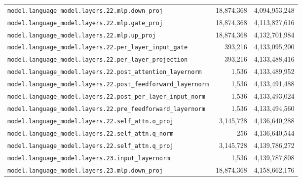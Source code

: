 \documentclass[10pt,a4paper]{article}
\theoremstyle{definition}
\begin{document}
\begin{appendices}
\begin{longtable}{p{9.5cm}rr}
\texttt{model.\allowbreak{}language\_model.\allowbreak{}layers.\allowbreak{}22.\allowbreak{}mlp.\allowbreak{}down\_proj} & 18,874,368 & 4,094,953,248 \\
\texttt{model.\allowbreak{}language\_model.\allowbreak{}layers.\allowbreak{}22.\allowbreak{}mlp.\allowbreak{}gate\_proj} & 18,874,368 & 4,113,827,616 \\
\texttt{model.\allowbreak{}language\_model.\allowbreak{}layers.\allowbreak{}22.\allowbreak{}mlp.\allowbreak{}up\_proj} & 18,874,368 & 4,132,701,984 \\
\texttt{model.\allowbreak{}language\_model.\allowbreak{}layers.\allowbreak{}22.\allowbreak{}per\_layer\_input\_gate} & 393,216 & 4,133,095,200 \\
\texttt{model.\allowbreak{}language\_model.\allowbreak{}layers.\allowbreak{}22.\allowbreak{}per\_layer\_projection} & 393,216 & 4,133,488,416 \\
\texttt{model.\allowbreak{}language\_model.\allowbreak{}layers.\allowbreak{}22.\allowbreak{}post\_attention\_layernorm} & 1,536 & 4,133,489,952 \\
\texttt{model.\allowbreak{}language\_model.\allowbreak{}layers.\allowbreak{}22.\allowbreak{}post\_feedforward\_layernorm} & 1,536 & 4,133,491,488 \\
\texttt{model.\allowbreak{}language\_model.\allowbreak{}layers.\allowbreak{}22.\allowbreak{}post\_per\_layer\_input\_norm} & 1,536 & 4,133,493,024 \\
\texttt{model.\allowbreak{}language\_model.\allowbreak{}layers.\allowbreak{}22.\allowbreak{}pre\_feedforward\_layernorm} & 1,536 & 4,133,494,560 \\
\texttt{model.\allowbreak{}language\_model.\allowbreak{}layers.\allowbreak{}22.\allowbreak{}self\_attn.\allowbreak{}o\_proj} & 3,145,728 & 4,136,640,288 \\
\texttt{model.\allowbreak{}language\_model.\allowbreak{}layers.\allowbreak{}22.\allowbreak{}self\_attn.\allowbreak{}q\_norm} & 256 & 4,136,640,544 \\
\texttt{model.\allowbreak{}language\_model.\allowbreak{}layers.\allowbreak{}22.\allowbreak{}self\_attn.\allowbreak{}q\_proj} & 3,145,728 & 4,139,786,272 \\
\texttt{model.\allowbreak{}language\_model.\allowbreak{}layers.\allowbreak{}23.\allowbreak{}input\_layernorm} & 1,536 & 4,139,787,808 \\
\texttt{model.\allowbreak{}language\_model.\allowbreak{}layers.\allowbreak{}23.\allowbreak{}mlp.\allowbreak{}down\_proj} & 18,874,368 & 4,158,662,176 \\

\end{longtable}
\end{appendices}
\end{document}
